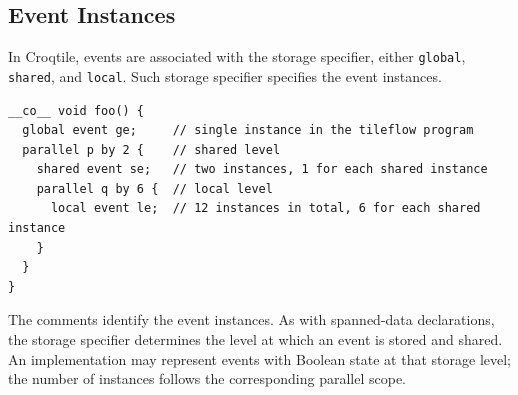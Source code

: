 \subsection*{Event Instances}

In Croqtile, events are associated with the storage specifier, either \texttt{global}, \texttt{shared}, and \texttt{local}. Such storage specifier specifies the event instances.

\begin{lstlisting}[language=croqtile,caption={Event Instances}]
__co__ void foo() {
  global event ge;     // single instance in the tileflow program
  parallel p by 2 {    // shared level
    shared event se;   // two instances, 1 for each shared instance
    parallel q by 6 {  // local level
      local event le;  // 12 instances in total, 6 for each shared instance
    }
  }
}
\end{lstlisting}

The comments identify the event instances. As with spanned-data declarations, the storage specifier determines the level at which an event is stored and shared. An implementation may represent events with Boolean state at that storage level; the number of instances follows the corresponding parallel scope.
